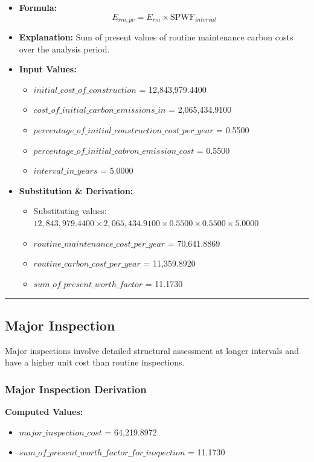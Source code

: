 \documentclass[12pt,a4paper]{article}
\begin{document}
\begin{itemize}
  \item \textbf{Formula:} $$E_{rm,pv} = E_{rm} \times \text{SPWF}_{interval}$$
  \item \textbf{Explanation:} Sum of present values of routine maintenance carbon costs over the analysis period.
  \item \textbf{Input Values:}
  \begin{itemize}
    \item $initial\_cost\_of\_construction$ = 12,843,979.4400
    \item $cost\_of\_initial\_carbon\_emissions\_in$ = 2,065,434.9100
    \item $percentage\_of\_initial\_construction\_cost\_per\_year$ = 0.5500
    \item $percentage\_of\_initial\_cabron\_emission\_cost$ = 0.5500
    \item $interval\_in\_years$ = 5.0000
  \end{itemize}
  \item \textbf{Substitution \& Derivation:}
  \begin{itemize}
    \item Substituting values: $12,843,979.4400 \times 2,065,434.9100 \times 0.5500 \times 0.5500 \times 5.0000$
    \item $routine\_maintenance\_cost\_per\_year$ = 70,641.8869
    \item $routine\_carbon\_cost\_per\_year$ = 11,359.8920
    \item $sum\_of\_present\_worth\_factor$ = 11.1730
  \end{itemize}
\end{itemize}


\medskip\hrule\medskip


\subsection{Major Inspection}

Major inspections involve detailed structural assessment at longer intervals and have a higher unit cost than routine inspections.


\subsubsection{Major Inspection Derivation}

\textbf{Computed Values:}

\begin{itemize}
  \item $major\_inspection\_cost$ = 64,219.8972
  \item $sum\_of\_present\_worth\_factor\_for\_inspection$ = 11.1730
\end{itemize}
\end{document}
